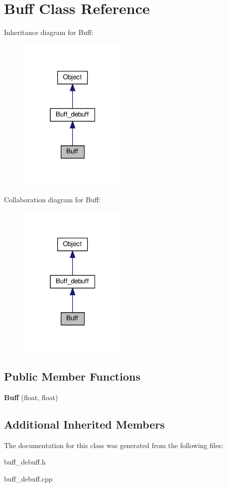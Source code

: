 \hypertarget{classBuff}{}\section{Buff Class Reference}
\label{classBuff}


Inheritance diagram for Buff\+:
\nopagebreak
\begin{figure}[H]
\begin{center}
\leavevmode
\includegraphics[width=147pt]{classBuff__inherit__graph}
\end{center}
\end{figure}


Collaboration diagram for Buff\+:
\nopagebreak
\begin{figure}[H]
\begin{center}
\leavevmode
\includegraphics[width=147pt]{classBuff__coll__graph}
\end{center}
\end{figure}
\subsection*{Public Member Functions}
\begin{DoxyCompactItemize}
\item 
\mbox{\label{classBuff_acf0a6baa7370f0b5f29cd086284e8f5b}} 
{\bfseries Buff} (float, float)
\end{DoxyCompactItemize}
\subsection*{Additional Inherited Members}


The documentation for this class was generated from the following files\+:\begin{DoxyCompactItemize}
\item 
buff\+\_\+debuff.\+h\item 
buff\+\_\+debuff.\+cpp\end{DoxyCompactItemize}
